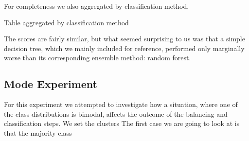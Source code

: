 For completeness we also aggregated by classification method.

\begin{table}[H]
\centering
\caption{Table aggregated by classification method}
\end{table}

The scores are fairly similar, but what seemed surprising to us was that a simple decision tree, which we mainly included for reference, 
performed only marginally worse than its corresponding ensemble method: random forest.


\subsection{Mode Experiment}

For this experiment we attempted to investigate how a situation, where one of the class distributions is bimodal, affects the outcome of the balancing and classification steps.
We set the clusters
The first case we are going to look at is that the majority class  
















